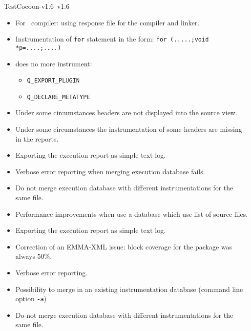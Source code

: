 \begin{TestCocoonDownload}
\begin{ReleaseNote}{TestCocoon-v1.6}{\TestCocoon\ v1.6}
\begin{description}
\begin{itemize}
    \item \BugFix For \VisualStudio\ compiler: using response file for the compiler and linker.
    \item \BugFix Instrumentation of \verb$for$ statement in the form: \verb$for (.....;void *p=....;....)$
    \item \BugFix {} does no more instrument:
                  \begin{itemize}
                    \item \verb$Q_EXPORT_PLUGIN$
                    \item \verb$Q_DECLARE_METATYPE$
                  \end{itemize}
  \end{itemize}
\item[\CoverageBrowser]
  \begin{itemize}
    \item \BugFix     Under some circumstances headers are not displayed into the source view.
    \item \BugFix     Under some circumstances the instrumentation of some headers are missing in the reports.
    \item \NewFeature Exporting the execution report as simple text log.
    \item \NewFeature Verbose error reporting when merging execution database fails.
    \item \BugFix     Do not merge execution database with different instrumentations for the same file.
    \item \Profiling  Performance improvements when use a database which use list of source files.
  \end{itemize}
\item[\cmreport]
  \begin{itemize}
    \item \NewFeature Exporting the execution report as simple text log.
    \item \BugFix Correction of an EMMA-XML issue: block coverage for the package was always 50\%.
  \end{itemize}
\item[\cmmerge]
  \begin{itemize}
    \item \NewFeature Verbose error reporting.
    \item \NewFeature Possibility to merge in an existing instrumentation database (command line option \verb$-a$)
    \item \BugFix     Do not merge execution database with different instrumentations for the same file.
  \end{itemize}
\end{description}
\end{ReleaseNote}
\end{TestCocoonDownload}



